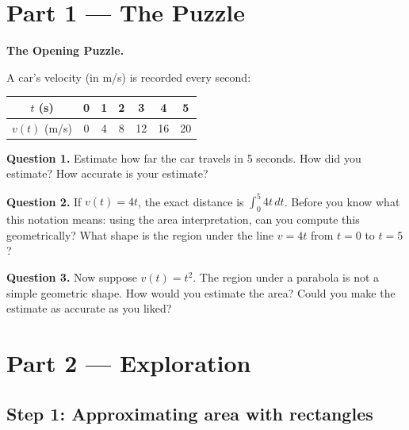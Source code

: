 \documentclass[12pt, a4paper]{article}
\begin{document}
\newpage

\section{Part 1 \texorpdfstring{---}{--} The Puzzle}

\begin{puzzlebox}
\textbf{The Opening Puzzle.}

A car's velocity (in m/s) is recorded every second:

\begin{center}
\begin{tabular}{ccccccc}
\toprule
$t$ (s) & 0 & 1 & 2 & 3 & 4 & 5 \\
\midrule
$v(t)$ (m/s) & 0 & 4 & 8 & 12 & 16 & 20 \\
\bottomrule
\end{tabular}
\end{center}

\textbf{Question 1.} Estimate how far the car travels in 5 seconds. How did you estimate? How accurate is your estimate?

\textbf{Question 2.} If $v(t) = 4t$, the exact distance is $\int_0^5 4t\,dt$. Before you know what this notation means: using the area interpretation, can you compute this geometrically? What shape is the region under the line $v = 4t$ from $t=0$ to $t=5$?

\textbf{Question 3.} Now suppose $v(t) = t^2$. The region under a parabola is not a simple geometric shape. How would you estimate the area? Could you make the estimate as accurate as you liked?
\end{puzzlebox}

\section{Part 2 \texorpdfstring{---}{--} Exploration}

\subsection{Step 1: Approximating area with rectangles}
\end{document}
